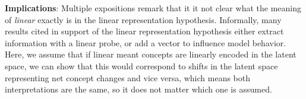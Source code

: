 \documentclass{article}
\newcommand{\z}{\mathbf{z}}
\renewcommand{\c}{\mathbf{c}}
\newcommand{\thicktilde}[1]{\mathbf{\tilde{\text{$#1$}}}}
\newcommand{\bsigma}{\boldsymbol{\Sigma}}
\begin{document}










    \textbf{Implications}: Multiple expositions \citep{templeton2024scaling} remark that it it not clear what the meaning of \textit{linear} exactly  is in the linear representation hypothesis. Informally, many results cited in support of the linear representation hypothesis either extract information with a linear probe, or add a vector to influence model behavior. Here, we assume that if linear meant concepts are linearly encoded in the latent space, we can show that this would correspond to shifts in the latent space representing net concept changes and vice versa, which means both interpretations are the same, so it does not matter which one is assumed. 
\end{document}
